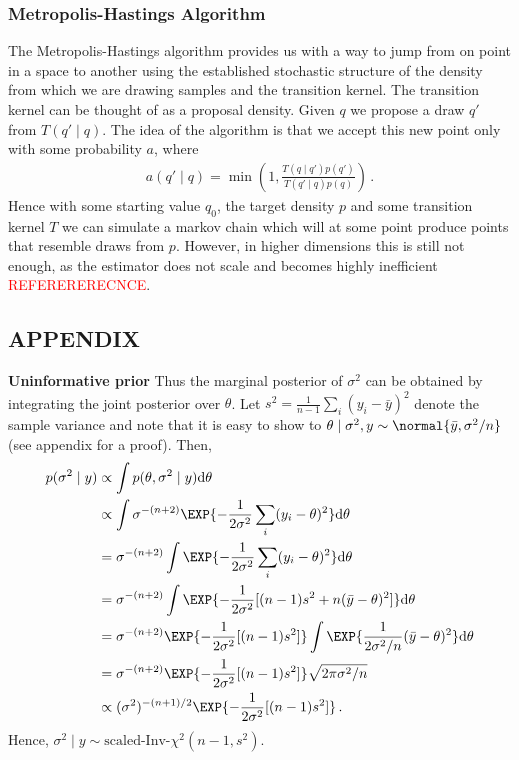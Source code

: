 \subsubsection*{Metropolis-Hastings Algorithm}
The Metropolis-Hastings algorithm provides us with a way to jump from on point
in a space to another using the established stochastic structure of the density
from which we are drawing samples and the transition kernel. The transition kernel
can be thought of as a proposal density. Given $q$ we propose a draw $q'$ from $T(q' \mid q)$.
The idea of the algorithm is that we accept this new point only with some probability $a$,
where
\begin{align}
  a(q' \mid q) = \min \left (1, \frac{T(q\mid q') p(q')}{T(q' \mid q) p(q)} \right) \,.
\end{align}
Hence with some starting value $q_0$, the target density $p$ and some transition kernel $T$
we can simulate a markov chain which will at some point produce points that resemble draws
from $p$. However, in higher dimensions this is still not enough, as the estimator does
not scale and becomes highly inefficient \textcolor{red}{REFERERERECNCE}.







\subsection{APPENDIX}
\textbf{Uninformative prior}
Thus the marginal posterior of $\sigma^2$ can be obtained by integrating the joint posterior
over $\theta$. Let $s^2 = \frac{1}{n-1} \sum_i (y_i - \bar{y})^2$ denote the sample
variance and note that it is easy to show to
$\theta \mid \sigma^2, y \sim \normal{\bar{y}, \sigma^2/n}$ (see appendix for a proof).
Then,
\begin{align}
  p(\sigma^2 \mid y) &\propto \int p(\theta, \sigma^2 \mid y) \mathrm{d} \theta\\
  &\propto \int \sigma^{-(n+2)} \EXP{-\frac{1}{2\sigma^2}\sum_i (y_i - \theta)^2} \mathrm{d} \theta\\
  &= \sigma^{-(n+2)} \int \EXP{-\frac{1}{2\sigma^2}\sum_i (y_i - \theta)^2} \mathrm{d} \theta\\
  &= \sigma^{-(n+2)} \int \EXP{-\frac{1}{2\sigma^2}[(n-1) s^2 + n(\bar{y} - \theta)^2]} \mathrm{d} \theta\\
  &= \sigma^{-(n+2)} \EXP{-\frac{1}{2\sigma^2}[(n-1) s^2]} \int \EXP{\frac{1}{2\sigma^2/n}(\bar{y} - \theta)^2} \mathrm{d} \theta\\
  &= \sigma^{-(n+2)} \EXP{-\frac{1}{2\sigma^2}[(n-1) s^2]} \sqrt{2 \pi \sigma^2 / n} \\
  &\propto (\sigma^2)^{-(n+1)/2} \EXP{-\frac{1}{2\sigma^2}[(n-1) s^2]} \,.
\end{align}
Hence, $\sigma^2 \mid y \sim \text{scaled-Inv-} \chi^2(n-1, s^2)$.

